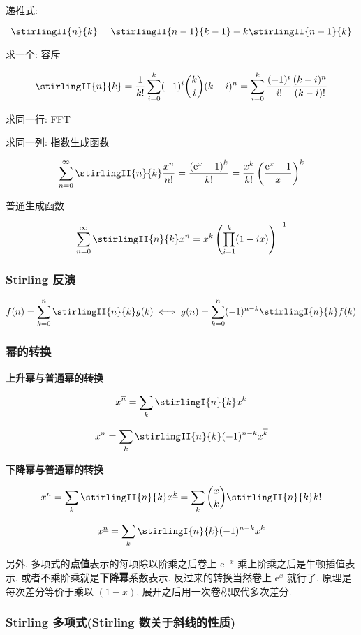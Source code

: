 递推式:

\[
    \stirlingII{n}{k} = \stirlingII{n-1}{k-1} + k\stirlingII{n-1}{k}
\]

求一个: 容斥

\[
    \stirlingII{n}{k} = \frac{1}{k!} \sum_{i = 0}^k (-1)^i \binom{k}{i} (k - i)^n = \sum_{i = 0}^k \frac{(-1)^i}{i!} \frac{(k - i)^n}{(k - i)!}
\]

求同一行: FFT

求同一列: 指数生成函数

\[
    \sum_{n = 0}^\infty \stirlingII{n}{k} \frac{x^n}{n!} = \frac{\left(\mathrm{e}^x - 1\right)^k}{k!} = \frac{x^k}{k!} \left( \frac{\mathrm{e}^x - 1}{x} \right)^k
\]

普通生成函数

\[
    \sum_{n = 0}^\infty \stirlingII{n}{k} x^n = x^k \left(\prod_{i = 1}^k (1 - i x)\right)^{-1}
\]

\subsubsection{Stirling 反演}

\[
    f(n) = \sum_{k = 0}^n \stirlingII{n}{k} g(k) \iff g(n) = \sum_{k = 0}^n (-1)^{n - k} \stirlingI{n}{k} f(k)
\]

\subsubsection{幂的转换}

\textbf{上升幂与普通幂的转换}

\[
    x^{\overline{n}}=\sum_{k} \stirlingI{n}{k} x^k
\]

\[
    x^n=\sum_{k} \stirlingII{n}{k} (-1)^{n-k} x^{\overline{k}}
\]

\textbf{下降幂与普通幂的转换}

\[
    x^n=\sum_{k} \stirlingII{n}{k} x^{\underline{k}} = \sum_{k} \binom{x}{k} \stirlingII{n}{k} k!
\]

\[
    x^{\underline{n}}=\sum_{k} \stirlingI{n}{k} (-1)^{n-k} x^k
\]

另外, 多项式的\textbf{点值}表示的每项除以阶乘之后卷上 \(\mathrm{e}^{-x}\) 乘上阶乘之后是牛顿插值表示, 或者不乘阶乘就是\textbf{下降幂}系数表示. 反过来的转换当然卷上 \(\mathrm{e}^x\) 就行了. 原理是每次差分等价于乘以 \((1 - x)\), 展开之后用一次卷积取代多次差分.

\subsubsection{Stirling 多项式(Stirling 数关于斜线的性质)}

